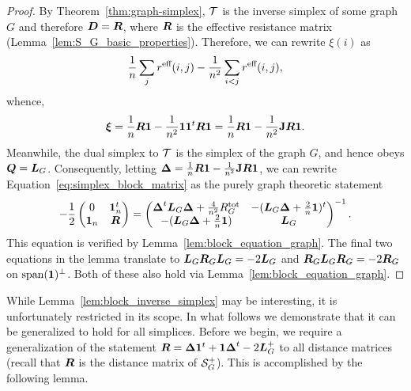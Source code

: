 \begin{proof}
By Theorem~\ref{thm:graph-simplex}, $\mathcal{T}$ is the inverse simplex of some graph $G$ and therefore $\vb*{D}=\vb*{R}$, where $\vb*{R}$ is the effective resistance matrix (Lemma~\ref{lem:S_G_basic_properties}). Therefore, we can rewrite $\xi(i)$ as 
 \begin{align*}
\frac{1}{n}\sum_j r^{\textnormal{eff}}(i,j) - \frac{1}{n^2}\sum_{i<j}r^{\textnormal{eff}}(i,j),
\end{align*}
whence,
\begin{align*}
\vb*{\xi} = \frac{1}{n}\vb*{R}\vb{1} - \frac{1}{n^2} \vb{1} \vb{1}^t \vb*{R}\vb{1} = \frac{1}{n}\vb*{R}\vb{1} - \frac{1}{n^2} \vb{J} \vb*{R}\vb{1}.
\end{align*}
Meanwhile, the dual simplex to $\mathcal{T}$ is the simplex of the graph $G$, and hence obeys $\vb*{Q}=\vb*{L}_G$. Consequently, letting $\vb*{\Delta}=\frac{1}{n}\vb*{R}\vb{1} - \frac{1}{n^2} \vb{J} \vb*{R}\vb{1}$, we can rewrite Equation~\eqref{eq:simplex_block_matrix} as the purely graph theoretic statement  
\begin{equation*}
	-\frac{1}{2} \begin{pmatrix}
0 & \vb{1}_n^t \\ 
\vb{1}_n &  \vb*{R}
\end{pmatrix} = 
\begin{pmatrix}
\vb*{\Delta}^t \vb*{L}_G\vb*{\Delta} + \frac{4}{n^2}R^{\textnormal{tot}}_G & -(\vb*{L}_G\vb*{\Delta} + \frac{2}{n}\vb{1})^t \\
-(\vb*{L}_G\vb*{\Delta} + \frac{2}{n}\vb{1}) & \vb*{L}_G
\end{pmatrix}^{-1}.
\end{equation*}
This equation is verified by Lemma~\ref{lem:block_equation_graph}. The final two equations in  the lemma translate to $\vb*{L}_G\vb*{R}_G\vb*{L}_G=-2\vb*{L}_G$ and $\vb*{R}_G\vb*{L}_G\vb*{R}_G=-2\vb*{R}_G$ on $\textnormal{span}(\vb{1})^\perp$. Both of these also hold  via Lemma~\ref{lem:block_equation_graph}. 
\end{proof}


While Lemma~\ref{lem:block_inverse_simplex} may be interesting, it is unfortunately restricted in its scope. In what follows we demonstrate that it can be generalized to hold for all simplices. Before we begin, we require a generalization of the statement $\vb*{R}=\vb*{\Delta}\vb{1}^t+\vb{1}\vb*{\Delta}^t - 2\vb*{L}_G^+$ to all distance  matrices (recall  that $\vb*{R}$ is the  distance  matrix of $\mathcal{S}_G^+$). This is accomplished by  the following lemma. 


